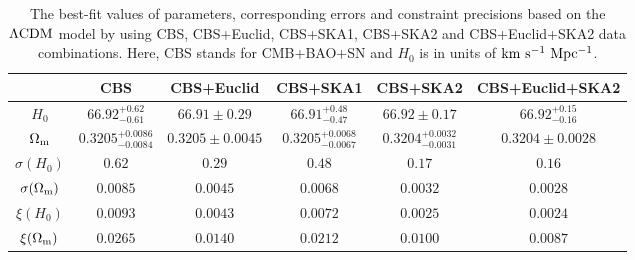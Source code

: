 \documentclass[aps,prd,amsmath,amssymb,showpacs,floats,floatfix,nofootinbib,reprint]{revtex4-1}
\begin{document}
\begin{table}
\renewcommand{\arraystretch}{1.5}
\caption{\label{tab1}The best-fit values of parameters, corresponding errors and constraint precisions based on the ${\rm \Lambda CDM}$ model by using CBS, CBS+Euclid, CBS+SKA1, CBS+SKA2 and CBS+Euclid+SKA2 data combinations. Here, CBS stands for CMB+BAO+SN and $H_0$ is in units of ${\rm km\ s^{-1}\ Mpc^{-1}}$.}
\begin{tabular}{|c|c c c c c|}
\hline
&CBS&CBS+Euclid&CBS+SKA1&CBS+SKA2&CBS+Euclid+SKA2\\
\hline
$H_0$&$66.92^{+0.62}_{-0.61}$&$66.91\pm0.29$&$66.91^{+0.48}_{-0.47}$&$66.92\pm0.17$&$66.92^{+0.15}_{-0.16}$\\
 $\Omega_{\rm m}$&$0.3205^{+0.0086}_{-0.0084}$&$0.3205\pm0.0045$&$0.3205^{+0.0068}_{-0.0067}$&$0.3204^{+0.0032}_{-0.0031}$&$0.3204\pm0.0028$\\

\hline
  $\sigma(H_0)$&$0.62$&$0.29$&$0.48$&$0.17$&$0.16$\\
 $\sigma(\Omega_{\rm m})$&$0.0085$&$0.0045$&$0.0068$&$0.0032$&$0.0028$\\
\hline
$\xi(H_0)$&$0.0093$&$0.0043$&$0.0072$&$0.0025$&$0.0024$\\
 $\xi(\Omega_{\rm m})$&$0.0265$&$0.0140$&$0.0212$&$0.0100$&$0.0087$\\
\hline
\end{tabular}
\end{table}
\end{document}
